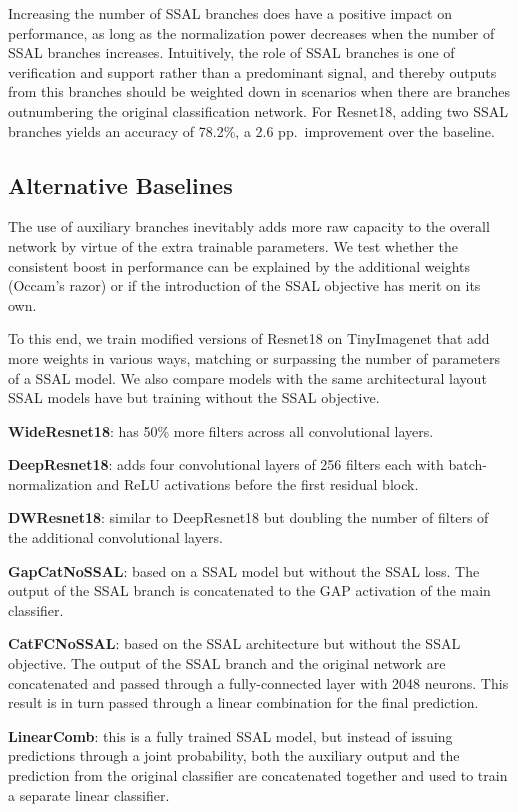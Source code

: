\documentclass[10pt,twocolumn,letterpaper]{article}
\begin{document}
Increasing the number of SSAL branches does have a positive impact on performance, as long as the normalization power  decreases when the number of SSAL branches increases.
Intuitively, the role of SSAL branches is one of verification and support rather than a predominant signal, and thereby outputs from this branches should be weighted down in scenarios when there are branches outnumbering the original classification network.
For Resnet18, adding two SSAL branches yields an accuracy of 78.2\%, a 2.6 pp.~improvement over the baseline.


\subsection{Alternative Baselines}
\label{subsec:baselines}
The use of auxiliary branches inevitably adds more raw capacity to the overall network by virtue of the extra trainable parameters.
We test whether the consistent boost in performance can be explained by the additional weights (Occam's razor) or if the introduction of the SSAL objective has merit on its own.

To this end, we train modified versions of Resnet18 on TinyImagenet that add more weights in various ways, matching or surpassing the number of parameters of a SSAL model.
We also compare models with the same architectural layout SSAL models have but training without the SSAL objective.

\textbf{WideResnet18}: has 50\% more filters across all convolutional layers.

\textbf{DeepResnet18}: adds four convolutional layers of 256 filters each with batch-normalization and ReLU activations before the first residual block.

\textbf{DWResnet18}: similar to DeepResnet18 but doubling the number of filters of the additional convolutional layers.

\textbf{GapCatNoSSAL}: based on a SSAL model but without the SSAL loss.
The output of the SSAL branch is concatenated to the GAP activation of the main classifier.

\textbf{CatFCNoSSAL}: based on the SSAL architecture but without the SSAL objective.
The output of the SSAL branch and the original network are concatenated and passed through a fully-connected layer with 2048 neurons.
This result is in turn passed through a linear combination for the final prediction.


\textbf{LinearComb}: this is a fully trained SSAL model, but instead of issuing predictions through a joint probability, both the auxiliary output and the prediction from the original classifier are concatenated together and used to train a separate linear classifier.
\end{document}
